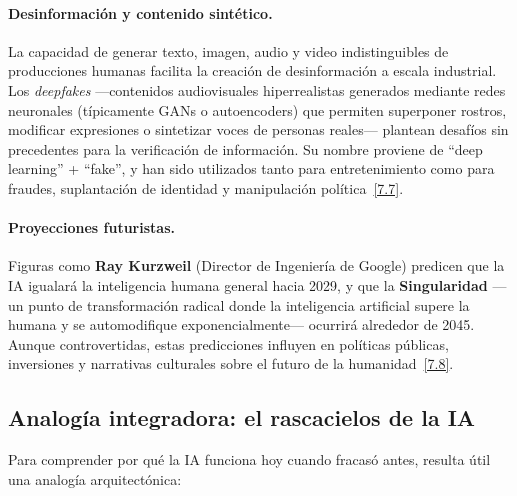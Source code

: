 \documentclass[12pt,a4paper]{report}
\numberwithin{figure}{section}
\begin{document}
\paragraph{Desinformación y contenido sintético.}
La capacidad de generar texto, imagen, audio y video indistinguibles de producciones humanas facilita la creación de desinformación a escala industrial. Los \textit{deepfakes} ---contenidos audiovisuales hiperrealistas generados mediante redes neuronales (típicamente GANs o autoencoders) que permiten superponer rostros, modificar expresiones o sintetizar voces de personas reales--- plantean desafíos sin precedentes para la verificación de información. Su nombre proviene de ``deep learning'' + ``fake'', y han sido utilizados tanto para entretenimiento como para fraudes, suplantación de identidad y manipulación política~\hyperref[ref:7]{[7.7]}.

\paragraph{Proyecciones futuristas.}
Figuras como \textbf{Ray Kurzweil} (Director de Ingeniería de Google) predicen que la IA igualará la inteligencia humana general hacia 2029, y que la \textbf{Singularidad} ---un punto de transformación radical donde la inteligencia artificial supere la humana y se automodifique exponencialmente--- ocurrirá alrededor de 2045. Aunque controvertidas, estas predicciones influyen en políticas públicas, inversiones y narrativas culturales sobre el futuro de la humanidad~\hyperref[ref:7]{[7.8]}.

\subsection[Analogía: el rascacielos de la IA]{Analogía integradora: el rascacielos de la IA}
\label{subsec:analogia_rascacielos}

Para comprender por qué la IA funciona hoy cuando fracasó antes, resulta útil una analogía arquitectónica:
\end{document}
